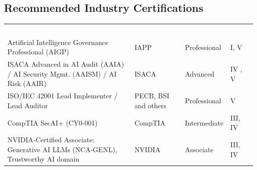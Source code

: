 \documentclass[10pt,a4paper]{article}
\newcommand{\hdr}{\rowcolor{navy}}
\newcommand{\hw}[1]{\textcolor{white}{\bfseries #1}}
\begin{document}
\subsection*{Recommended Industry Certifications}
\par{\small\begin{tabularx}{\linewidth}{@{}Y>{\raggedright\arraybackslash}p{3.0cm}>{\raggedright\arraybackslash}p{2.2cm}p{1.3cm}@{}}\hdr\hw{Certification}&\hw{Issuer}&\hw{Level}&\hw{Units}\\
Artificial Intelligence Governance Professional (AIGP) & IAPP & Professional & I, V\\
ISACA Advanced in AI Audit (AAIA) / AI Security Mgmt. (AAISM) / AI Risk (AAIR) & ISACA & Advanced & IV , V\\
ISO/IEC 42001 Lead Implementer / Lead Auditor & PECB, BSI and others & Professional & V\\
CompTIA SecAI+ (CY0-001) & CompTIA & Intermediate & III, IV\\
NVIDIA-Certified Associate: Generative AI LLMs (NCA-GENL), Trustworthy AI domain & NVIDIA & Associate & III, IV\\
\bottomrule\end{tabularx}}
\end{document}
